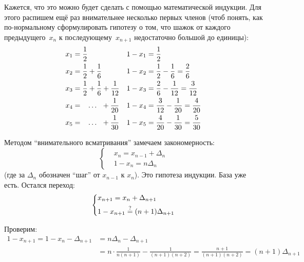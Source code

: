 \documentclass[a4paper,12pt]{article}
\begin{document}
\begin{solution}
    
    Кажется, что это можно будет сделать с помощью математической индукции.
    Для этого распишем ещё раз внимательнее несколько первых членов (чтоб понять, как по-нормальному сформулировать гипотезу о том, что шажок от каждого предыдущего~$x_n$ к последующему~$x_{n + 1}$ недостаточно большой до единицы):
    \[ %
      \begin{aligned}
        &x_1 = \frac{1}{2} & &1 - x_1 = \frac{1}{2}\\
        &x_2 = \frac{1}{2} + \frac{1}{6} & & 1 - x_2 = \frac{1}{2} - \frac{1}{6} = \frac{2}{6}\\
        &x_3 = \frac{1}{2} + \frac{1}{6} + \frac{1}{12} & &1 - x_3 = \frac{2}{6} - \frac{1}{12} = \frac{3}{12}\\
        &x_4 = \hphantom{\,\:\;} \ldots \hphantom{\:\;} + \frac{1}{20} & &1 - x_4 = \frac{3}{12} - \frac{1}{20} = \frac{4}{20}\\
        &x_5 = \hphantom{\,\:\;} \ldots \hphantom{\:\;} + \frac{1}{30} & &1 - x_5 = \frac{4}{20} - \frac{1}{30} = \frac{5}{30}
      \end{aligned}
    \]
    
    Методом ``внимательного всматривания'' замечаем закономерность:
    \[
      \left\{
        \begin{aligned}
          &x_n = x_{n - 1} + \Delta_{n}\\
          &1 - x_n = n \Delta_n
        \end{aligned}
      \right.
    \]
    (где за $\Delta_n$ обозначен ``шаг'' от $x_{n - 1}$ к $x_n$).
    Это гипотеза индукции.
    База уже есть.
    Остался переход:
    \[
      \left\{
        \begin{aligned}
          &x_{n + 1} = x_{n} + \Delta_{n + 1}\\
          &1 - x_{n + 1} \overset{\operatorname{?}}{=} (n + 1) \Delta_{n + 1}
        \end{aligned}
      \right.
    \]
    
    Проверим:
    \begin{equation*}
    \begin{split}
      1 - x_{n + 1} = 1 - x_n - \Delta_{n + 1}
        &= n \Delta_n - \Delta_{n + 1}\\
        &= n \cdot \frac{1}{n(n + 1)} - \frac{1}{(n + 1)(n + 2)}
        = \frac{n + 1}{(n + 1)(n + 2)}
        = (n + 1) \Delta_{n + 1}
    \end{split}
    \end{equation*}
    

\end{solution}
\end{document}
